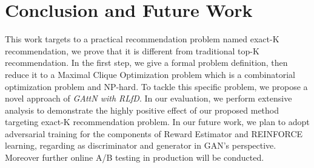 \section{Conclusion and Future Work}
This work targets to a practical recommendation problem named exact-K recommendation,
we prove that it is different from traditional top-K recommendation.
In the first step, we give a formal problem definition,
then reduce it to a Maximal Clique Optimization problem which is a combinatorial optimization problem and NP-hard.
To tackle this specific problem, we propose a novel approach of \emph{GAttN with RLfD}.
In our evaluation, we perform extensive analysis to demonstrate the highly positive effect of our proposed method targeting exact-K recommendation problem.
In our future work, we plan to adopt adversarial training for the components of Reward Estimator and REINFORCE learning, regarding as discriminator and generator in GAN's \cite{goodfellow2014generative} perspective.
Moreover further online A/B testing in production will be conducted.